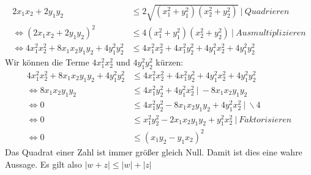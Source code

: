 \documentclass{article}
\begin{document}
\begin{enumerate}[ label = (\alph*) ]
\begin{enumerate}
            \begin{align*}
                2 x_1 x_2  + 2 y_1 y_2 &\leq 2 \sqrt{ (x_1^2 + y_1^2) (x_2^2 + y_2^2) } \ | \ Quadrieren \\
                \Leftrightarrow  {( 2 x_1 x_2  + 2 y_1 y_2 )}^2 &\leq 4 (x_1^2 + y_1^2) (x_2^2 + y_2^2) \ | \ Ausmultiplizieren \\
                \Leftrightarrow  4 x_1^2 x_2^2 + 8 x_1 x_2 y_1 y_2 + 4 y_1^2 y_2^2 & \leq 4 x_1^2 x_2^2 + 4 x_1^2 y_2^2 + 4 y_1^2 x_2^2 + 4 y_1^2 y_2^2
            \end{align*}
            Wir können die Terme \(4 x_1^2 x_2^2\) und \(4 y_1^2 y_2^2\) kürzen:
            \begin{align*}
               4 x_1^2 x_2^2 + 8 x_1 x_2 y_1 y_2 + 4 y_1^2 y_2^2 & \leq 4 x_1^2 x_2^2 + 4 x_1^2 y_2^2 + 4 y_1^2 x_2^2 + 4 y_1^2 y_2^2 \\
               \Leftrightarrow 8 x_1 x_2 y_1 y_2 & \leq 4 x_1^2 y_2^2 + 4 y_1^2 x_2^2 \ | \ - 8 x_1 x_2 y_1 y_2 \\
               \Leftrightarrow 0 & \leq 4 x_1^2 y_2^2 - 8 x_1 x_2 y_1 y_2 + 4 y_1^2 x_2^2 \ | \ \backslash 4 \\
               \Leftrightarrow 0 & \leq x_1^2 y_2^2 - 2 x_1 x_2 y_1 y_2 + y_1^2 x_2^2\ | \ Faktorisieren \\
               \Leftrightarrow 0 & \leq {(x_1 y_2 - y_1 x_2)}^2
            \end{align*}
            Das Quadrat einer Zahl ist immer größer gleich Null. Damit ist dies eine wahre Aussage.
            Es gilt also \( |w + z| \leq |w| + |z| \)


\end{enumerate}
\end{enumerate}
\end{document}
